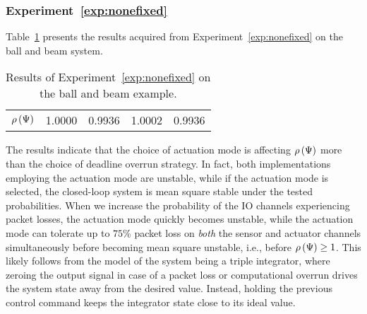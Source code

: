 \subsubsection*{Experiment~\ref{exp:nonefixed}}%
Table~\ref{tab:bnb} presents the results acquired from Experiment~\ref{exp:nonefixed} on the ball and beam system.
%
\begin{table}[h]
    \centering
    \def\arraystretch{1.25}
    \caption{Results of Experiment~\ref{exp:nonefixed} on the ball and beam example.}
    \label{tab:bnb}
    \begin{tabular}{c|cccc}
                            & \tKZ{} & \tKH{} & \tSZ{} & \tSH{} \\\hline\hline
        $\rho\left( \Psi \right)$  & 1.0000 & 0.9936 & 1.0002 & 0.9936
    \end{tabular}
\end{table}

The results indicate that the choice of actuation mode is affecting $\rho\left( \Psi \right)$ more than the choice of deadline overrun strategy.
In fact, both implementations employing the \tZ{} actuation mode are unstable, while if the \tH{} actuation mode is selected, the closed-loop system is mean square stable under the tested probabilities.
When we increase the probability of the IO channels experiencing packet losses, the \tZ{} actuation mode quickly becomes unstable, while the \tH{} actuation mode can tolerate up to $75$\% packet loss on \emph{both} the sensor and actuator channels simultaneously before becoming mean square unstable, i.e., before $\rho\left( \Psi \right) \geq 1$.
This likely follows from the model of the system being a triple integrator, where zeroing the output signal in case of a packet loss or computational overrun drives the system state away from the desired value.
Instead, holding the previous control command keeps the integrator state close to its ideal value.  

